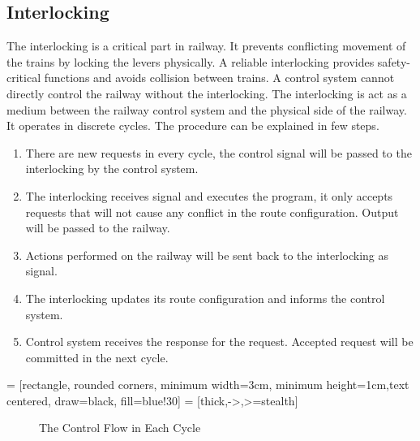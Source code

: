 \documentclass[a4paper,11pt]{report}
\begin{document}
\subsection{Interlocking}
The interlocking is a critical part in railway. It prevents conflicting movement of the trains by locking the levers physically. A reliable interlocking provides safety-critical functions and avoids collision between trains. A control system cannot directly control the railway without the interlocking. The interlocking is act as a medium between the railway control system and the physical side of the railway. It operates in discrete cycles. The procedure can be explained in few steps.
\begin{enumerate}
\item There are new requests in every cycle, the control signal will be passed to the interlocking by the control system.
\item The interlocking receives signal and executes the program, it only accepts requests that will not cause any conflict in the route configuration. Output will be passed to the railway.
\item Actions performed on the railway will be sent back to the interlocking as signal.
\item The interlocking updates its route configuration and informs the control system.
\item Control system receives the response for the request. Accepted request will be committed in the next cycle. 
\end{enumerate}
\usetikzlibrary{shapes.geometric, arrows}
 = [rectangle, rounded corners, minimum width=3cm, minimum height=1cm,text centered, draw=black, fill=blue!30]
 = [thick,->,>=stealth]
\begin{figure}[!ht]
  \centering
{}
\caption{The Control Flow in Each Cycle}
\end{figure}
\FloatBarrier
\end{document}
